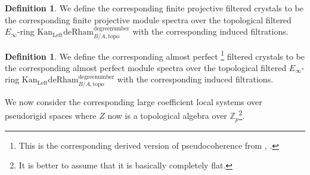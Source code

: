 \documentclass[11pt]{book}
\theoremstyle{definition}
\newtheorem{definition}[theorem]{Definition}
\numberwithin{equation}{section}
\begin{document}
\begin{definition}
We define the corresponding finite projective filtered crystals to be the corresponding finite projective module spectra over the topological filtered $E_\infty$-ring $\mathrm{Kan}_\mathrm{Left}\mathrm{deRham}^\text{degreenumber}_{B/A,\mathrm{topo}}$ with the corresponding induced filtrations.	
\end{definition}


\begin{definition}
We define the corresponding almost perfect \footnote{This is the corresponding derived version of pseudocoherence from \cite{12Lu1}, \cite{12Lu2}.} filtered crystals to be the corresponding almost perfect module spectra over the topological filtered $E_\infty$-ring $\mathrm{Kan}_\mathrm{Left}\mathrm{deRham}^\text{degreenumber}_{B /A,\mathrm{topo}}$ with the corresponding induced filtrations.	
\end{definition}


\indent We now consider the corresponding large coefficient local systems over pseudorigid spaces where $Z$ now is a topological algebra over $\mathbb{Z}_p$\footnote{It is better to assume that it is basically completely flat.}.



\end{document}

